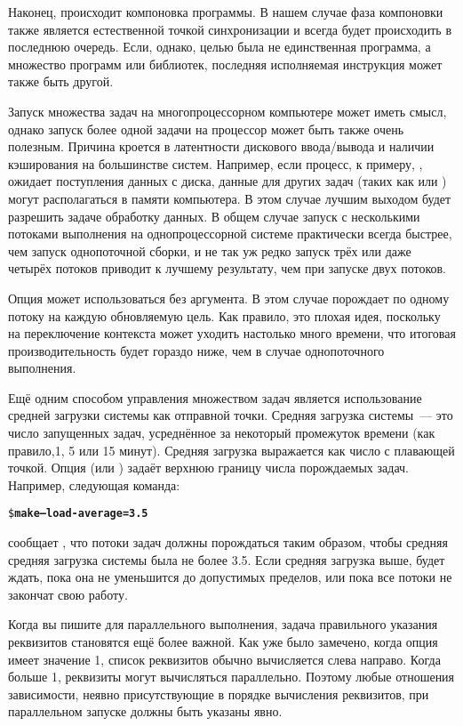 Наконец, происходит компоновка программы. В нашем случае фаза
компоновки также является естественной точкой синхронизации и всегда
будет происходить в последнюю очередь. Если, однако, целью была не
единственная программа, а множество программ или библиотек, последняя
исполняемая инструкция может также быть другой.

Запуск множества задач на многопроцессорном компьютере может иметь
смысл, однако запуск более одной задачи на процессор может быть также
очень полезным. Причина кроется в латентности дискового ввода/вывода и
наличии кэширования на большинстве систем. Например, если процесс, к
примеру, , ожидает поступления данных с диска, данные для
других задач (таких как  или ) могут
располагаться в памяти компьютера. В этом случае лучшим выходом будет
разрешить задаче обработку данных. В общем случае запуск \GNUmake{} с
несколькими потоками выполнения на однопроцессорной системе
практически всегда быстрее, чем запуск однопоточной сборки, и не так уж
редко запуск трёх или даже четырёх потоков приводит к лучшему
результату, чем при запуске двух потоков.

Опция  может использоваться без аргумента. В этом
случае \GNUmake{} порождает по одному потоку на каждую обновляемую
цель. Как правило, это плохая идея, поскольку на переключение
контекста может уходить настолько много времени, что итоговая
производительность будет гораздо ниже, чем в случае однопоточного
выполнения.

Ещё одним способом управления множеством задач является использование
средней загрузки системы как отправной точки. Средняя загрузка
системы~--- это число запущенных задач, усреднённое за некоторый
промежуток времени (как правило,1, 5 или 15 минут). Средняя загрузка
выражается как число с плавающей точкой. Опция
 (или ) задаёт верхнюю границу
числа порождаемых задач. Например, следующая команда:

{\footnotesize
\begin{alltt}
\$ \textbf{make --load-average=3.5}
\end{alltt}
}

сообщает \GNUmake{}, что потоки задач должны порождаться таким
образом, чтобы средняя средняя загрузка системы была не более
3.5. Если средняя загрузка выше, \GNUmake{} будет ждать, пока она не
уменьшится до допустимых пределов, или пока все потоки не закончат
свою работу.

Когда вы пишите \makefile{} для параллельного выполнения, задача
правильного указания реквизитов становятся ещё более важной. Как уже
было замечено, когда опция  имеет значение 1, список
реквизитов обычно вычисляется слева направо. Когда 
больше 1, реквизиты могут вычисляться параллельно. Поэтому любые
отношения зависимости, неявно присутствующие в порядке вычисления
реквизитов, при параллельном запуске должны быть указаны явно.

